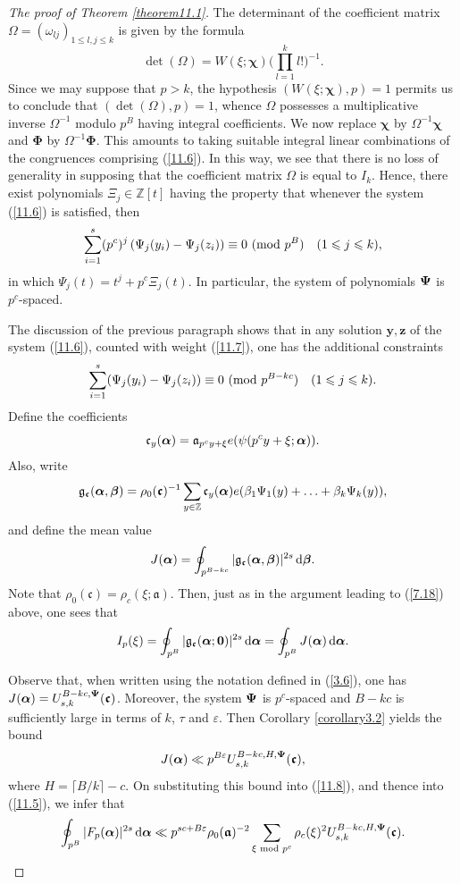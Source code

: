 \documentclass[12pt,reqno]{amsart}
\theoremstyle{definition}
\theoremstyle{remark}
\numberwithin{equation}{section}
\newcommand{\mmod}[1]{\,\,(\text{\rm mod}\,\,#1)}
\newcommand{\nmod}[1]{\,\,\text{\rm mod}\,\,#1}
\def\bfy{{\mathbf y}}
\def\bfz{{\mathbf z}}
\def\dbZ{{\mathbb Z}}\def\dbQ{{\mathbb Q}}
\def\gra{{\mathfrak a}}\def\grA{{\mathfrak A}}\def\bfgra{{\boldsymbol \gra}}
\def\grc{{\mathfrak c}}\def\grC{{\mathfrak C}}\def\bfgrc{{\boldsymbol \grc}}
\def\grg{{\mathfrak g}}\def\grG{{\mathfrak G}}
\def\bet{{\beta}}  \def\bfbet{{\boldsymbol \beta}}
\def\bfPhi{{\boldsymbol \Phi}} \def\bfvarphi{{\boldsymbol \varphi}}
\def\bfchi{{\boldsymbol \chi}}
\def\ome{{\omega}} \def\Ome{{\Omega}}
\def\eps{\varepsilon}
\def\le{\leqslant} \def\ge{\geqslant} \def\pleq{\preccurlyeq} \def\ple{\prec}
\def\d{{\,{\rm d}}}
\begin{document}
\begin{proof}[The proof of Theorem \ref{theorem11.1}]
The determinant of the coefficient matrix $\Ome =(\ome_{lj})_{1\le l,j\le k}$ is given by 
the formula
$$\det(\Ome)=W(\xi;\bfchi)\biggl( \prod_{l=1}^kl!\biggr)^{-1}.$$
Since we may suppose that $p>k$, the hypothesis $(W(\xi;\bfchi),p)=1$ permits us to 
conclude that $(\det(\Ome),p)=1$, whence $\Ome$ possesses a multiplicative inverse 
$\Ome^{-1}$ modulo $p^B$ having integral coefficients. We now replace $\bfchi$ by 
$\Ome^{-1}\bfchi$ and $\bfPhi$ by $\Ome^{-1}\bfPhi$. This amounts to taking suitable 
integral linear combinations of the congruences comprising (\ref{11.6}). In this way, we see 
that there is no loss of generality in supposing that the coefficient matrix $\Ome$ is equal to 
$I_k$. Hence, there exist polynomials $\Xi_j\in \dbZ[t]$ having the property that whenever 
the system (\ref{11.6}) is satisfied, then
$$\sum_{i=1}^s(p^c)^j\left( \Psi_j(y_i)-\Psi_j(z_i)\right)\equiv 0\mmod{p^B}\quad 
(1\le j\le k),$$
in which $\Psi_j(t)=t^j+p^c\Xi_j(t)$. In particular, the system of polynomials ${\boldsymbol \Psi}$ is 
$p^c$-spaced.\par

The discussion of the previous paragraph shows that in any solution $\bfy,\bfz$ of the 
system (\ref{11.6}), counted with weight (\ref{11.7}), one has the additional constraints
$$\sum_{i=1}^s(\Psi_j(y_i)-\Psi_j(z_i))\equiv 0\mmod{p^{B-kc}}\quad (1\le j\le k).$$
Define the coefficients
$$\grc_y(\bfalp)=\gra_{p^cy+\xi}e(\psi(p^cy+\xi;\bfalp)).$$
Also, write
$$\grg_\bfgrc(\bfalp,\bfbet)=\rho_0(\bfgrc)^{-1}\sum_{y\in \dbZ}\grc_y(\bfalp)
e(\bet_1\Psi_1(y)+\ldots +\bet_k\Psi_k(y)),$$
and define the mean value
$$J(\bfalp)=\oint_{p^{B-kc}}|\grg_\bfgrc(\bfalp,\bfbet)|^{2s}\d\bfbet .$$
Note that $\rho_0(\bfgrc)=\rho_c(\xi;\bfgra)$. Then, just as in the argument leading to 
(\ref{7.18}) above, one sees that
\begin{equation}\label{11.8}
I_p(\xi)=\oint_{p^B}|\grg_\bfgrc(\bfalp;{\mathbf 0})|^{2s}\d\bfalp =\oint_{p^B}
J(\bfalp)\d\bfalp .
\end{equation}

Observe that, when written using the notation defined in (\ref{3.6}), one has 
$J(\bfalp)=U_{s,k}^{B-kc, \bfPsi}(\bfgrc)$. Moreover, the system ${\boldsymbol \Psi}$ is $p^c$-spaced 
and $B-kc$ is sufficiently large in terms of $k$, $\tau$ and $\eps$. Then Corollary 
\ref{corollary3.2} yields the bound
$$J(\bfalp)\ll p^{B\eps}U_{s,k}^{B-kc,H,\bfPsi}(\bfgrc),$$
where $H=\lceil B/k\rceil -c$. On substituting this bound into (\ref{11.8}), and thence into 
(\ref{11.5}), we infer that
\begin{equation}\label{11.9}
\oint_{p^B}|F_p(\bfalp)|^{2s}\d\bfalp \ll p^{sc+B\eps}
\rho_0(\bfgra)^{-2}\sum_{\xi\nmod{p^c}}
\rho_c(\xi)^2U_{s,k}^{B-kc,H,\bfPsi}(\bfgrc).
\end{equation}


\end{proof}
\end{document}
